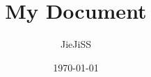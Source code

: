 \documentclass[UTF8]{ctexart}
\title{My Document}
\author{JieJiSS}
\date{\today}
\begin{document}
  \maketitle
  \setlength{\parskip}{1mm}
  \begin{spacing}{0.8}
  
  
  
  \end{spacing}
\end{document}
